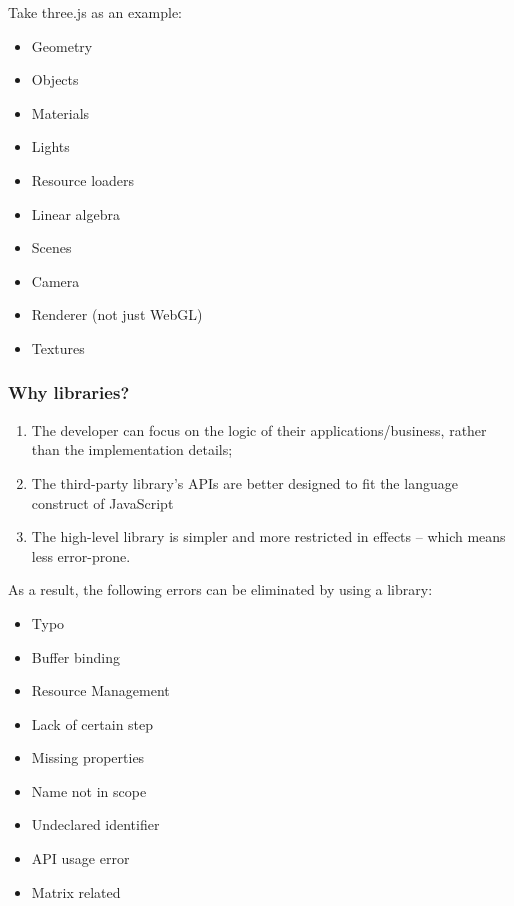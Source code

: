 \documentclass[]{article}
\begin{document}
Take three.js as an example:

\begin{itemize}
\itemsep1pt\parskip0pt
\item
  Geometry
\item
  Objects
\item
  Materials
\item
  Lights
\item
  Resource loaders
\item
  Linear algebra
\item
  Scenes
\item
  Camera
\item
  Renderer (not just WebGL)
\item
  Textures
\end{itemize}

\subsubsection{Why libraries?}\label{why-libraries}

\begin{enumerate}
\def\labelenumi{\arabic{enumi}.}
\itemsep1pt\parskip0pt
\item
  The developer can focus on the logic of their applications/business,
  rather than the implementation details;
\item
  The third-party library's APIs are better designed to fit the language
  construct of JavaScript
\item
  The high-level library is simpler and more restricted in effects --
  which means less error-prone.
\end{enumerate}

As a result, the following errors can be eliminated by using a library:

\begin{itemize}
\itemsep1pt\parskip0pt
\item
  Typo
\item
  Buffer binding
\item
  Resource Management
\item
  Lack of certain step
\item
  Missing properties
\item
  Name not in scope
\item
  Undeclared identifier
\item
  API usage error
\item
  Matrix related
\end{itemize}
\end{document}
